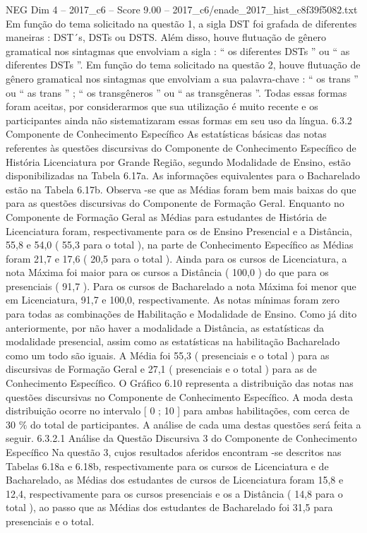 \begin{textsample}{NEG Dim 4 – 2017\_c6 – Score 9.00 – 2017\_c6/enade\_2017\_hist\_c8f39f5082.txt}
Em função do tema solicitado na questão 1, a sigla DST foi grafada de diferentes maneiras : DST´s, DSTs ou DSTS.
Além disso, houve flutuação de gênero gramatical nos sintagmas que envolviam a sigla : “ os diferentes DSTs ” ou “ as diferentes DSTs ”.
Em função do tema solicitado na questão 2, houve flutuação de gênero gramatical nos sintagmas que envolviam a sua palavra-chave : “ os trans ” ou “ as trans ” ; “ os transgêneros ” ou “ as transgêneras ”.
Todas essas formas foram aceitas, por considerarmos que sua utilização é muito recente e os participantes ainda não sistematizaram essas formas em seu uso da língua. 6.3.2 Componente de Conhecimento Específico As estatísticas básicas das notas referentes às questões discursivas do Componente de Conhecimento Específico de História Licenciatura por Grande Região, segundo Modalidade de Ensino, estão disponibilizadas na Tabela 6.17a.
As informações equivalentes para o Bacharelado estão na Tabela 6.17b.
Observa -se que as Médias foram bem mais baixas do que para as questões discursivas do Componente de Formação Geral.
Enquanto no Componente de Formação Geral as Médias para estudantes de História de Licenciatura foram, respectivamente para os de Ensino Presencial e a Distância, 55,8 e 54,0 ( 55,3 para o total ), na parte de Conhecimento Específico as Médias foram 21,7 e 17,6 ( 20,5 para o total ).
Ainda para os cursos de Licenciatura, a nota Máxima foi maior para os cursos a Distância ( 100,0 ) do que para os presenciais ( 91,7 ).
Para os cursos de Bacharelado a nota Máxima foi menor que em Licenciatura, 91,7 e 100,0, respectivamente.
As notas mínimas foram zero para todas as combinações de Habilitação e Modalidade de Ensino.
Como já dito anteriormente, por não haver a modalidade a Distância, as estatísticas da modalidade presencial, assim como as estatísticas na habilitação Bacharelado como um todo são iguais.
A Média foi 55,3 ( presenciais e o total ) para as discursivas de Formação Geral e 27,1 ( presenciais e o total ) para as de Conhecimento Específico.
O Gráfico 6.10 representa a distribuição das notas nas questões discursivas no Componente de Conhecimento Específico.
A moda desta distribuição ocorre no intervalo [ 0 ; 10 ] para ambas habilitações, com cerca de 30 \% do total de participantes.
A análise de cada uma destas questões será feita a seguir. 6.3.2.1 Análise da Questão Discursiva 3 do Componente de Conhecimento Específico Na questão 3, cujos resultados aferidos encontram -se descritos nas Tabelas 6.18a e 6.18b, respectivamente para os cursos de Licenciatura e de Bacharelado, as Médias dos estudantes de cursos de Licenciatura foram 15,8 e 12,4, respectivamente para os cursos presenciais e os a Distância ( 14,8 para o total ), ao passo que as Médias dos estudantes de Bacharelado foi 31,5 para presenciais e o total.

\end{textsample}
